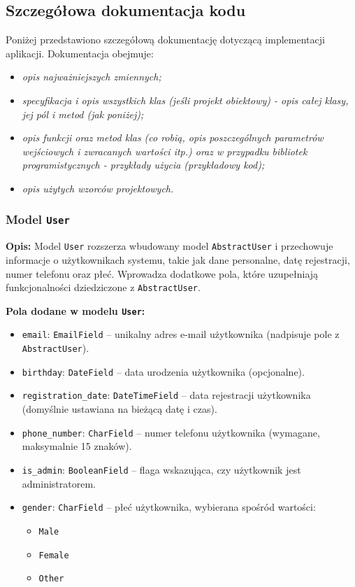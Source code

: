 \documentclass[12pt,a4paper,oneside]{article}
\theoremstyle{definition}
\numberwithin{equation}{section}
\begin{document}
\clearpage
\subsection{Szczegółowa dokumentacja kodu}
Poniżej przedstawiono szczegółową dokumentację dotyczącą implementacji aplikacji. Dokumentacja obejmuje:
\begin{itemize}
\item \textit{opis najważniejszych zmiennych;}
\item \textit{specyfikacja i opis wszystkich klas (jeśli projekt obiektowy) - opis całej klasy, jej pól i metod (jak poniżej);}
\item \textit{opis funkcji oraz metod klas (co robią, opis poszczególnych parametrów wejściowych i zwracanych wartości itp.) oraz w przypadku bibliotek programistycznych - przykłady użycia (przykładowy kod);} 
\item \textit{opis użytych wzorców projektowych.}
\end{itemize}
\subsubsection{Model \texttt{User}}
\textbf{Opis:} 
Model \texttt{User} rozszerza wbudowany model \texttt{AbstractUser} i przechowuje informacje o użytkownikach systemu, takie jak dane personalne, datę rejestracji, numer telefonu oraz płeć. Wprowadza dodatkowe pola, które uzupełniają funkcjonalności dziedziczone z \texttt{AbstractUser}.

\textbf{Pola dodane w modelu \texttt{User}:}
\begin{itemize}
    \item \texttt{email}: \texttt{EmailField} – unikalny adres e-mail użytkownika (nadpisuje pole z \texttt{AbstractUser}).
    \item \texttt{birthday}: \texttt{DateField} – data urodzenia użytkownika (opcjonalne).
    \item \texttt{registration\_date}: \texttt{DateTimeField} – data rejestracji użytkownika (domyślnie ustawiana na bieżącą datę i czas).
    \item \texttt{phone\_number}: \texttt{CharField} – numer telefonu użytkownika (wymagane, maksymalnie 15 znaków).
    \item \texttt{is\_admin}: \texttt{BooleanField} – flaga wskazująca, czy użytkownik jest administratorem.
    \item \texttt{gender}: \texttt{CharField} – płeć użytkownika, wybierana spośród wartości:
    \begin{itemize}
        \item \texttt{Male}
        \item \texttt{Female}
        \item \texttt{Other}
    \end{itemize}
\end{itemize}
\end{document}
